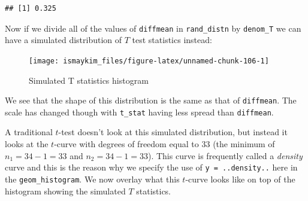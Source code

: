 \documentclass[]{tufte-book}
\newenvironment{Shaded}{\begin{snugshade}}{\end{snugshade}}
\newcommand{\KeywordTok}[1]{\textcolor[rgb]{0.13,0.29,0.53}{\textbf{{#1}}}}
\newcommand{\DataTypeTok}[1]{\textcolor[rgb]{0.13,0.29,0.53}{{#1}}}
\newcommand{\DecValTok}[1]{\textcolor[rgb]{0.00,0.00,0.81}{{#1}}}
\newcommand{\StringTok}[1]{\textcolor[rgb]{0.31,0.60,0.02}{{#1}}}
\newcommand{\NormalTok}[1]{{#1}}
\theoremstyle{definition}
\theoremstyle{definition}
\theoremstyle{remark}
\begin{document}
\begin{verbatim}
## [1] 0.325
\end{verbatim}

Now if we divide all of the values of \texttt{diffmean} in
\texttt{rand\_distn} by \texttt{denom\_T} we can have a simulated
distribution of \(T\) test statistics instead:

\begin{Shaded}
\end{Shaded}

\begin{figure}

{\centering \texttt{[image: ismaykim\_files/figure-latex/unnamed-chunk-106-1]} 

}

\caption[Simulated T statistics histogram]{Simulated T statistics histogram}\label{fig:unnamed-chunk-106}
\end{figure}

We see that the shape of this distribution is the same as that of
\texttt{diffmean}. The scale has changed though with \texttt{t\_stat}
having less spread than \texttt{diffmean}.

A traditional \(t\)-test doesn't look at this simulated distribution,
but instead it looks at the \(t\)-curve with degrees of freedom equal to
33 (the minimum of \(n_1 = 34 - 1 = 33\) and \(n_2 = 34 - 1 = 33\)).
This curve is frequently called a \emph{density} curve and this is the
reason why we specify the use of \texttt{y\ =\ ..density..} here in the
\texttt{geom\_histogram}. We now overlay what this \(t\)-curve looks
like on top of the histogram showing the simulated \(T\) statistics.
\end{document}
